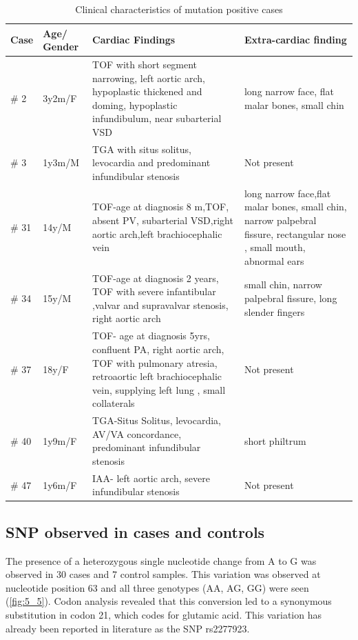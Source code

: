 \begin{refsection}
\begin{landscape}
\begin{table}[!tb]
\centering
\caption[Clinical characteristics of mutation positive cases]{Clinical characteristics of mutation positive cases}
\label{tab:5_6}
\begin{tabular}{ p{0.75in} p{1in} p{3in} p{3in} }
\toprule
	\textbf{Case} & \textbf{Age/ Gender}  & \textbf{Cardiac Findings} & \textbf{Extra-cardiac finding} \\ \toprule
	\# 2 & 3y2m/F & TOF with short segment narrowing, left aortic arch, hypoplastic thickened and doming, hypoplastic infundibulum, near subarterial VSD & long narrow face, flat malar bones, small chin \\ \midrule
	\# 3 & 1y3m/M & TGA with situs solitus, levocardia and predominant infundibular stenosis & Not present \\ \midrule
	\# 31 & 14y/M & TOF-age at diagnosis 8 m,TOF, absent PV, subarterial VSD,right aortic arch,left brachiocephalic vein & long narrow face,flat malar bones, small chin, narrow palpebral fissure, rectangular nose , small mouth, abnormal ears \\ \midrule
	\# 34 & 15y/M & TOF-age at diagnosis 2 years, TOF with severe infantibular ,valvar and supravalvar stenosis, right aortic arch & small chin, narrow palpebral fissure, long slender fingers \\ \midrule
	\# 37 & 18y/F & TOF- age at diagnosis 5yrs, confluent PA, right aortic arch, TOF with pulmonary atresia, retroaortic left brachiocephalic vein, supplying left lung , small collaterals & Not present \\ \midrule
	\# 40 & 1y9m/F & TGA-Situs Solitus, levocardia, AV/VA concordance, predominant infundibular stenosis & short philtrum \\ \midrule
	\# 47 & 1y6m/F & IAA- left aortic arch, severe infundibular stenosis & Not present \\ \bottomrule
\end{tabular}
\end{table}
\end{landscape}



\subsection{SNP observed in cases and controls}

The presence of a heterozygous single nucleotide change from A to G was observed in 30 cases and 7 control samples. This variation was observed at nucleotide position 63 and all three genotypes (AA, AG, GG) were seen (\cref{fig:5_5}). Codon analysis revealed that this conversion led to a synonymous substitution in codon 21, which codes for glutamic acid. This variation has already been reported in literature as the SNP rs2277923. 


\end{refsection}

